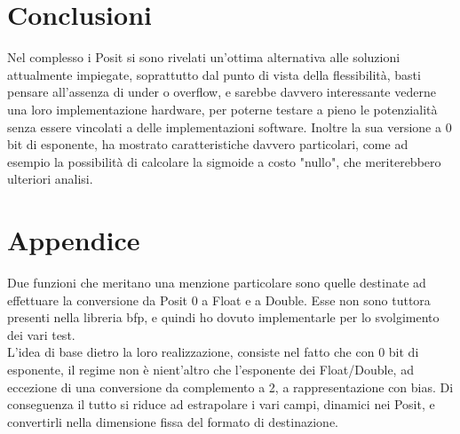 \documentclass[a4paper,11pt]{article}
\begin{document}
\newpage
\section{Conclusioni}
Nel complesso i Posit si sono rivelati un'ottima alternativa alle soluzioni attualmente impiegate, soprattutto dal punto di vista della flessibilità, basti pensare all'assenza di under o overflow, e sarebbe davvero interessante vederne una loro implementazione hardware, per poterne testare a pieno le potenzialità senza essere vincolati a delle implementazioni software. Inoltre la sua versione a 0 bit di esponente, ha mostrato caratteristiche davvero particolari, come ad esempio la possibilità di calcolare la sigmoide a costo "nullo", che meriterebbero ulteriori analisi.

\newpage

\section{Appendice}
Due funzioni che meritano una menzione particolare sono quelle destinate ad effettuare la conversione da Posit 0 a Float e a Double. Esse non sono tuttora presenti nella libreria bfp\cite{libbfp}, e quindi ho dovuto implementarle per lo svolgimento dei vari test.\\ L'idea di base dietro la loro realizzazione, consiste nel fatto che con 0 bit di esponente, il regime non è nient'altro che l'esponente dei Float/Double, ad eccezione di una conversione da complemento a 2, a rappresentazione con bias. Di conseguenza il tutto si riduce ad estrapolare i vari campi, dinamici nei Posit, e convertirli nella dimensione fissa del formato di destinazione.

\newpage
	
	\printbibliography[title=Bibliografia]

	
\end{document}
